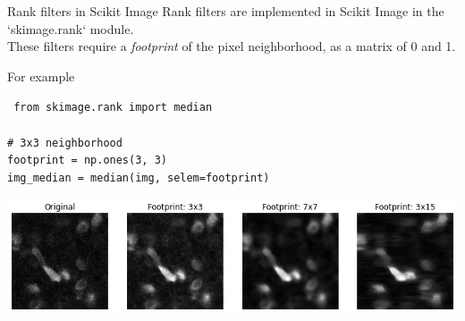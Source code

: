 \documentclass[9pt, aspectratio=169]{beamer}
\begin{document}
\begin{frame}
    {Rank filters in Scikit Image}
    Rank filters are implemented in Scikit Image in the `skimage.rank` module.\\
    These filters require a \textit{footprint} of the pixel neighborhood, as a matrix of 0 and 1.

    For example

    \begin{codebox}
        \texttt{
            from skimage.rank import median\\
            \\
            \# 3x3 neighborhood\\
            footprint = np.ones(3, 3)\\
            img\_median = median(img, selem=footprint)
        }
    \end{codebox}
    \centering
    \includegraphics[width=.85\textwidth]{median_filter_different_footprints.png}
\end{frame}
\end{document}
